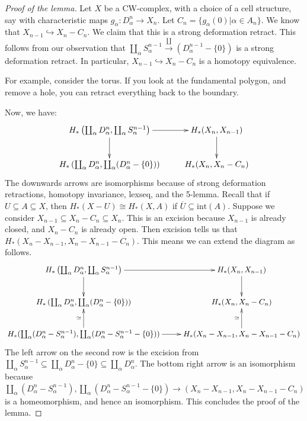 \begin{proof}[Proof of the lemma]
Let $X$ be a CW-complex, with a choice of a cell structure, say with characteristic maps $g_\alpha:D^n_\alpha\to X_n$. Let $C_n=\{g_\alpha(0)|\alpha\in A_n\}$. We know that $X_{n-1}\hookrightarrow X_n-C_n$. We claim that this is a strong deformation retract. This follows from our observation that $\coprod_\alpha S^{n-1}_\alpha\xrightarrow\coprod(D^{n-1}_\alpha-\{0\})$ is a strong deformation retract. In particular, $X_{n-1}\hookrightarrow X_n-C_n$ is a homotopy equivalence.

For example, consider the torus. If you look at the fundamental polygon, and remove a hole, you can retract everything back to the boundary.

Now, we have:
\begin{equation*}
\xymatrix{ H_\ast\left(\coprod_\alpha D^n_\alpha,\coprod_\alpha S^{n-1}_\alpha\right)\ar[r]\ar[d] & H_\ast(X_n,X_{n-1})\ar[d]\\
 H_\ast\left(\coprod_\alpha D^n_\alpha,\coprod_\alpha (D^n_\alpha-\{0\})\right) & H_\ast(X_n,X_n-C_n)}
\end{equation*}
The downwards arrows are isomorphisms because of strong deformation retractions, homotopy invariance, lexseq, and the 5-lemma. Recall that if $U\subseteq A\subseteq X$, then $ H_\ast(X-U)\cong H_\ast(X,A)$ if $\overline{U}\subseteq \mathrm{int}(A)$. Suppose we consider $X_{n-1}\subseteq X_n-C_n\subseteq X_n$. This is an excision because $X_{n-1}$ is already closed, and $X_n-C_n$ is already open. Then excision tells us that $ H_\ast(X_n-X_{n-1},X_n-X_{n-1}-C_n)$. This means we can extend the diagram as follows.
\begin{equation*}
\xymatrix{ H_\ast\left(\coprod_\alpha D^n_\alpha,\coprod_\alpha S^{n-1}_\alpha\right)\ar[r]\ar[d] & H_\ast(X_n,X_{n-1})\ar[d]\\
 H_\ast\left(\coprod_\alpha D^n_\alpha,\coprod_\alpha (D^n_\alpha-\{0\})\right) & H_\ast(X_n,X_n-C_n)\\
 H_\ast(\coprod_\alpha(D^n_\alpha-S^{n-1}_\alpha),\coprod_\alpha(D^n_\alpha-S^{n-1}_\alpha-\{0\}))\ar[r]\ar[u]^\cong & H_\ast(X_n-X_{n-1},X_n-X_{n-1}-C_n)\ar[u]^\cong}
\end{equation*}
The left arrow on the second row is the excision from $\coprod_\alpha S^{n-1}_\alpha\subseteq \coprod_\alpha D^n_\alpha-\{0\}\subseteq \coprod_\alpha D^n_\alpha$. The bottom right arrow is an isomorphism because $\coprod_\alpha(D^n_\alpha-S^{n-1}_\alpha),\coprod_\alpha(D^n_\alpha-S^{n-1}_\alpha-\{0\})\to (X_n-X_{n-1},X_n-X_{n-1}-C_n)$ is a homeomorphism, and hence an isomorphism. This concludes the proof of the lemma.
\end{proof}

